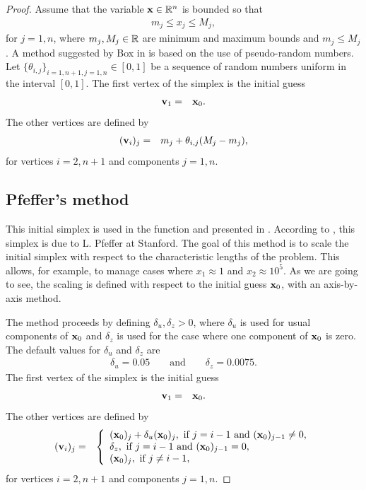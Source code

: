 \begin{proof}
Assume that the variable $\mathbf{x}\in\mathbb{R}^n$ is bounded so that 
\begin{eqnarray}
m_j \leq x_j \leq M_j,
\end{eqnarray}
for $j=1,n$, where $m_j,M_j\in\mathbb{R}$ are minimum 
and maximum bounds and $m_j\leq M_j$.
A method suggested by Box in \cite{Box1965} is 
based on the use of 
pseudo-random numbers. Let 
$\{\theta_{i,j}\}_{i=1,n+1,j=1,n}\in[0,1]$ be 
a sequence of random numbers uniform in the 
interval $[0,1]$.
The first vertex of the simplex is the initial guess 
\begin{eqnarray}
\mathbf{v}_1 &=& \mathbf{x}_0.
\end{eqnarray}
The other vertices are defined by 
\begin{eqnarray}
(\mathbf{v}_i)_j &=& m_j + \theta_{i,j} (M_j - m_j),
\end{eqnarray}
for vertices $i=2,n+1$ and components $j=1,n$.

\subsection{Pfeffer's method}

This initial simplex is used in the function 
and presented in \cite{Fan2002}. According to \cite{Fan2002}, this simplex is due to L. Pfeffer at Stanford.
The goal of this method is to scale the initial simplex with respect 
to the characteristic lengths of the problem. This allows, for example,
to manage cases where $x_1\approx 1$ and $x_2\approx 10^5$.
As we are going to see, the scaling is defined with respect to the 
initial guess $\mathbf{x}_0$, with an axis-by-axis method.

The method proceeds by defining $\delta_u,\delta_z>0$, where 
$\delta_u$ is used for usual components of $\mathbf{x}_0$ and $\delta_z$ is 
used for the case where one component of $\mathbf{x}_0$ is zero.
The default values for $\delta_u$ and $\delta_z$ are 
\begin{eqnarray}
\delta_u = 0.05 \qquad \textrm{and} \qquad \delta_z = 0.0075.
\end{eqnarray}
The first vertex of the simplex is the initial guess 
\begin{eqnarray}
\mathbf{v}_1 &=& \mathbf{x}_0.
\end{eqnarray}
The other vertices are defined by 
\begin{eqnarray}
(\mathbf{v}_i)_j &=& \left\{
\begin{array}{l}
(\mathbf{x}_0)_j + \delta_u (\mathbf{x}_0)_j, \textrm{ if } j=i-1 \textrm{ and } (\mathbf{x}_0)_{j-1}\neq 0,\\
\delta_z, \textrm{ if } j=i-1 \textrm{ and } (\mathbf{x}_0)_{j-1}= 0,\\
(\mathbf{x}_0)_j, \textrm{ if } j\neq i-1,\\
\end{array}
\right.
\end{eqnarray}
for vertices $i=2,n+1$ and components $j=1,n$.


\end{proof}
